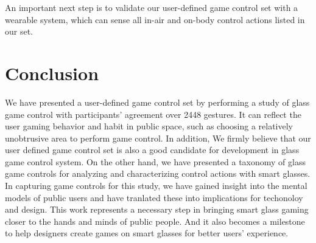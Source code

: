 \documentclass{sigchi}
\begin{document}
  An important next step is to validate our user-defined game control set with a wearable system, which can sense all in-air and on-body control actions listed in our set.   


\section{Conclusion}

We have presented a user-defined game control set by performing a study of glass game control with participants' agreement over 2448 gestures.
It can reflect the user gaming behavior and habit in public space, such as choosing a relatively unobtrusive area to perform game control. In addition, We firmly believe that our user defined game control set is also a good candidate for development in glass game control system. On the other hand, we have presented a taxonomy of glass game controls for analyzing and characterizing control actions with smart glasses. 
In capturing game controls for this study, we have gained insight into the mental models of public users and have tranlated these into implications for techonoloy and design. 
This work represents a necessary step in bringing smart glass gaming closer to the hands and minds of public people. And it also becomes a milestone to help designers create games on smart glasses for better users' experience.



\end{document}
